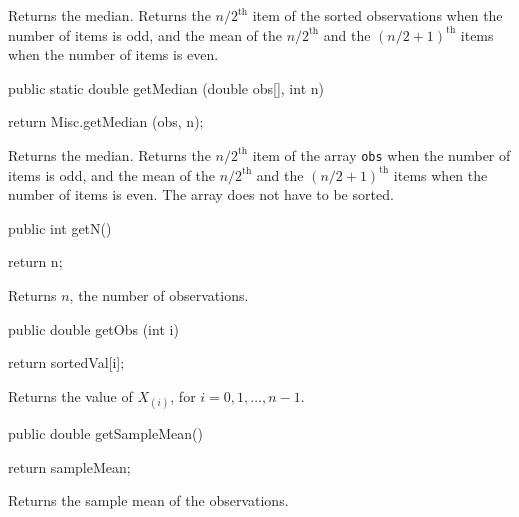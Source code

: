 \begin{tabb}
   Returns the median.
   Returns the $n/2^{\mbox{th}}$ item of the sorted observations when the number
   of items is odd, and the mean of the $n/2^{\mbox{th}}$ and the
   $(n/2 + 1)^{\mbox{th}}$ items when the number of items is even.
\end{tabb}
\begin{code}

   public static double getMedian (double obs[], int n)\begin{hide} {
      return Misc.getMedian (obs, n);
   }\end{hide}
\end{code}
\begin{tabb}
  Returns the median.
   Returns the $n/2^{\mbox{th}}$ item of the array \texttt{obs} when the number
   of items is odd, and the mean of the $n/2^{\mbox{th}}$ and the
   $(n/2 + 1)^{\mbox{th}}$ items when the number of items is even.
   The array does not have to be sorted.
\end{tabb}
\begin{htmlonly}
\end{htmlonly}
\begin{code}

   public int getN()\begin{hide} {
      return n;
   }\end{hide}
\end{code}
\begin{tabb}   Returns $n$, the number of observations.
\end{tabb}
\begin{code}

   public double getObs (int i)\begin{hide} {
      return sortedVal[i];
   }\end{hide}
\end{code}
\begin{tabb}   Returns the value of $X_{(i)}$, for $i=0, 1, \ldots, n-1$.
\end{tabb}
\begin{code}

   public double getSampleMean()\begin{hide} {
      return sampleMean;
   }\end{hide}
\end{code}
\begin{tabb}   Returns the sample mean of the observations.
\end{tabb}
